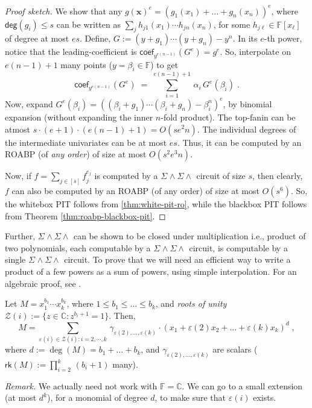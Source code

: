 \documentclass[10pt,a4paper]{article}
\newcommand{\F}{\mathbb{F}}
\newcommand{\C}{\mathbb{C}}
\newcommand{\x}{{\boldsymbol x}}
\newcommand{\rk}{\mathsf{rk}}
\newcommand{\cf}{\mathsf{coef}}
\newcommand{\pdeg}{\mathsf{deg}}
\newcommand{\SWSU}[2]{\Sigma^{#1}\!\wedge\!\Sigma\!\wedge^{#2}}
\numberwithin{equation}{section}
\begin{document}
\begin{proof}[Proof sketch]
We show that any $g(\x)^e = (g_1(x_1)+\hdots +g_n(x_n))^e$, where $\pdeg(g_i) \le s$ can be written as $ \sum_{j} h_{j1}(x_1) \cdots h_{jn}(x_n)$, for some $h_{j\ell} \in \F[x_{\ell}]$ of degree at most $es$. Define, $G := (y+g_1) \cdots (y+g_n)-y^n$. In its $e$-th power, notice that the leading-coefficient is $\cf_{y^{e(n-1)}}(G^e)= g^e$. So, interpolate on $e(n-1)+1$ many points ($y= \beta_i\in\F$) to get 
$$ \cf_{y^{e(n-1)}}(G^e) \;=\; \sum_{i=1}^{e(n-1)+1}\, \alpha_i\, G^e(\beta_i)\;.$$
Now, expand $G^e(\beta_i) = ((\beta_i +g_1) \cdots (\beta_i+g_n)-\beta_i^n)^e$, by binomial expansion (without expanding the inner $n$-fold product). The top-fanin can be atmost $s \cdot (e+1) \cdot (e(n-1)+1)= O(se^2n)$. The individual degrees of the intermediate univariates can be at most $es$. Thus, it can be computed by an ROABP (of {\em any order}) of size at most $O(s^2e^3n)$. 

Now, if $f=\sum_{j \in [s]} f_j^{e_j}$ is computed by a $\SWSU{}{}{}$ circuit of size $s$, then clearly, $f$ can also be computed by an ROABP (of any order) of size at most $O(s^6)$. So, the whitebox PIT follows from \autoref{thm:white-pit-ro}, while the blackbox PIT follows from Theorem \autoref{thm:roabp-blackbox-pit}.
\end{proof}

Further, $\SWSU{}{}$ can be shown to be closed under multiplication i.e., product of two polynomials, each computable by a $\SWSU{}{}$ circuit, is computable by a single $\SWSU{}{}$ circuit. To prove that we will need an efficient way to write a product of a few powers as a sum of powers, using simple interpolation. For an algebraic proof, see  \cite[Proposition~4.3]{CARLINI20125}. 

\begin{lemma} \label{lem:waring-rank}
Let $M= x_1^{b_1} \cdots x_k^{b_k}$, where $1 \le b_1 \le \hdots \le b_k$, and {\em roots of unity} $\mathcal{Z}(i):=\{z \in \C : z^{b_i+1}=1\}$. Then, $$M= \sum_{\varepsilon(i) \in \mathcal{Z}(i): i=2,\cdots,k}\, \gamma_{\varepsilon(2),\hdots,\varepsilon(k)} \cdot \left(x_1 + \varepsilon(2)x_2 + \hdots + \varepsilon(k)x_k\right)^d\;,$$ where  $d:= \deg(M)=b_1+\hdots+b_k$, and  $\gamma_{\varepsilon(2),\hdots,\varepsilon(k)}$ are scalars ($\rk(M):=\prod_{i=2}^k\,(b_i+1)$ many).       
\end{lemma}

{\noindent \em Remark.} We actually need not work with $\F=\C$. We can go to a small extension (at most $d^k$), for a monomial of degree $d$, to make sure that $\varepsilon(i)$ exists. 
\end{document}
